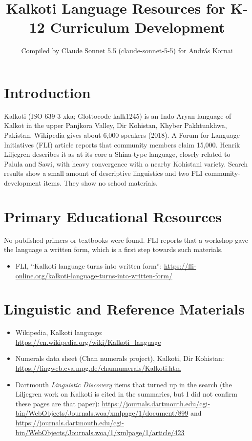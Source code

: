 \documentclass[12pt]{article}
\title{Kalkoti Language Resources for K-12 Curriculum Development}
\author{Compiled by Claude Sonnet 5.5 (claude-sonnet-5-5) for Andr\'as Kornai}
\date{}
\begin{document}
\maketitle

\section{Introduction}
Kalkoti (ISO 639-3 xka; Glottocode kalk1245) is an Indo-Aryan language of Kalkot in the upper Panjkora Valley, Dir Kohistan, Khyber Pakhtunkhwa, Pakistan. Wikipedia gives about 6,000 speakers (2018). A Forum for Language Initiatives (FLI) article reports that community members claim 15,000. Henrik Liljegren describes it as at its core a Shina-type language, closely related to Palula and Sawi, with heavy convergence with a nearby Kohistani variety. Search results show a small amount of descriptive linguistics and two FLI community-development items. They show no school materials.

\section{Primary Educational Resources}
No published primers or textbooks were found. FLI reports that a workshop gave the language a written form, which is a first step towards such materials.
\begin{itemize}
\item FLI, ``Kalkoti language turns into written form'': \url{https://fli-online.org/kalkoti-language-turns-into-written-form/}
\end{itemize}

\section{Linguistic and Reference Materials}
\begin{itemize}
\item Wikipedia, Kalkoti language: \url{https://en.wikipedia.org/wiki/Kalkoti_language}
\item Numerals data sheet (Chan numerals project), Kalkoti, Dir Kohistan: \url{https://lingweb.eva.mpg.de/channumerals/Kalkoti.htm}
\item Dartmouth \emph{Linguistic Discovery} items that turned up in the search (the Liljegren work on Kalkoti is cited in the summaries, but I did not confirm these pages are that paper): \url{https://journals.dartmouth.edu/cgi-bin/WebObjects/Journals.woa/xmlpage/1/document/899} and \url{https://journals.dartmouth.edu/cgi-bin/WebObjects/Journals.woa/1/xmlpage/1/article/423}
\end{itemize}
\end{document}
